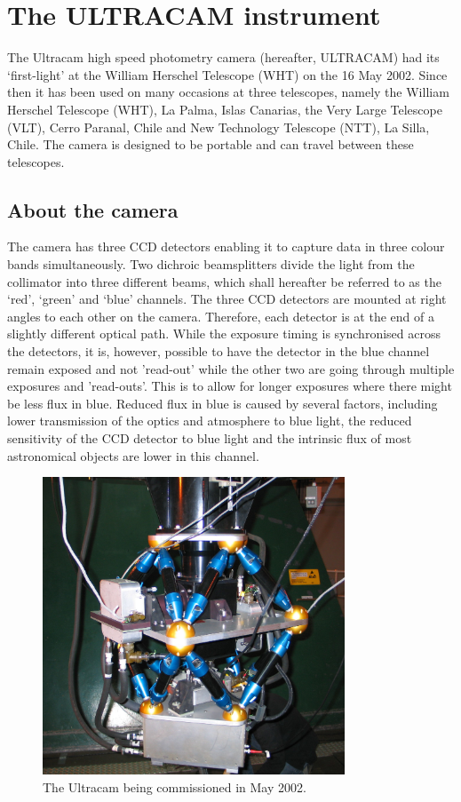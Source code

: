 \section{The ULTRACAM instrument} 

The Ultracam high speed photometry camera (hereafter, ULTRACAM) had its `first-light' at the William Herschel Telescope (WHT) on the 16 May 2002. Since then it has been used on many occasions at three telescopes, namely the William Herschel Telescope (WHT), La Palma, Islas Canarias, the Very Large Telescope (VLT), Cerro Paranal, Chile and New Technology Telescope (NTT), La Silla, Chile. The camera is designed to be portable and can travel between these telescopes. 

\subsection{About the camera}
The camera has three CCD detectors enabling it to capture data in three colour bands simultaneously. Two dichroic beamsplitters divide the light from the collimator into three different beams, which shall hereafter be referred to as the `red', `green' and `blue' channels. The three CCD detectors are mounted at right angles to each other on the camera. Therefore, each detector is at the end of a slightly different optical path. While the exposure timing is synchronised across the detectors, it is, however, possible to have the detector in the blue channel remain exposed and not 'read-out' while the other two are going through multiple exposures and 'read-outs'. This is to allow for longer exposures where there might be less flux in blue. Reduced flux in blue is caused by several factors, including lower transmission of the optics and atmosphere to blue light, the reduced sensitivity of the CCD detector to blue light and the intrinsic flux of most astronomical objects are lower in this channel.

\begin{figure}[!h]
\centering
\includegraphics[width=90mm]{images/IMG_0121_scaled.JPG}
\caption{The Ultracam being commissioned in May 2002.}
\label{fig1}
\end{figure}

